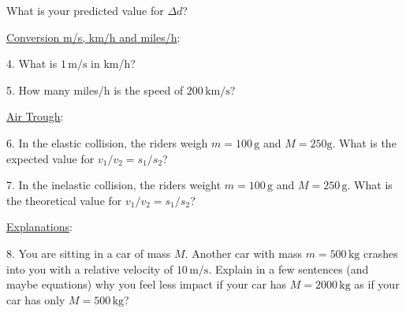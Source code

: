 What is your predicted value for $\Delta d$?\myskip

\noindent\underline{Conversion m/s, km/h and miles/h}: \myskip

4. What is $1\, \textrm{m/s}$ in km/h?\myskip

5. How many miles/h is the speed of $200\,\textrm{km/s}$?\myskip


\noindent\underline{Air Trough}:\myskip

6. In the elastic collision, the riders weigh $m = 100\,\textrm{g}$ and $M = 250\textrm{g}$. What is the expected value for $v_1/v_2 = s_1/s_2$?\myskip

7. In the inelastic collision, the riders weight $m = 100\,\textrm{g}$ and $M = 250\,\textrm{g}$. What is the theoretical value for $v_1/v_2 = s_1/s_2$? \myskip

\noindent\underline{Explanations}:\myskip

8. You are sitting in a car of mass $M$. Another car with mass $m = 500\,\textrm{kg}$ crashes into you with a relative velocity of $10\,\textrm{m/s}$. Explain in a few sentences (and maybe equations) why you feel less impact if your car has $M = 2000\,\textrm{kg}$ as if your car has only $M = 500\,\textrm{kg}$? 
